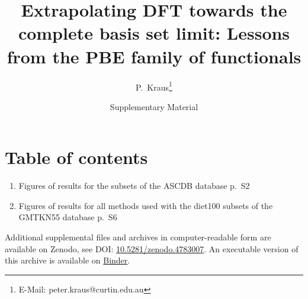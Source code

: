 \documentclass[12pt]{article}
\newcommand{\beginsupplement}{%
        \setcounter{table}{0}
        \renewcommand{\thetable}{S\arabic{table}}%
        \setcounter{figure}{0}
        \renewcommand{\thefigure}{S\arabic{figure}}%
        \renewcommand{\thepage}{S\arabic{page}}%
     }
\begin{document}
\title{Extrapolating DFT towards the complete basis set limit: Lessons from the PBE family of functionals}

\date{Supplementary Material}

\author{P.~Kraus\thanks{E-Mail: peter.kraus@curtin.edu.au}}

\maketitle




\beginsupplement

\section*{Table of contents}
\begin{enumerate}
	\item Figures of results for the subsets of the ASCDB database \hfill p.~S2
    \item Figures of results for all methods used with the diet100 subsets of the GMTKN55 database \hfill p.~S6
\end{enumerate}

Additional supplemental files and archives in computer-readable form are available on Zenodo, see DOI: \href{http://dx.doi.org/10.5281/zenodo.4783007}{10.5281/zenodo.4783007}. An executable version of this archive is available on \href{https://mybinder.org/v2/zenodo/10.5281/zenodo.4783007/?filepath=index.ipynb}{Binder}.
\end{document}

